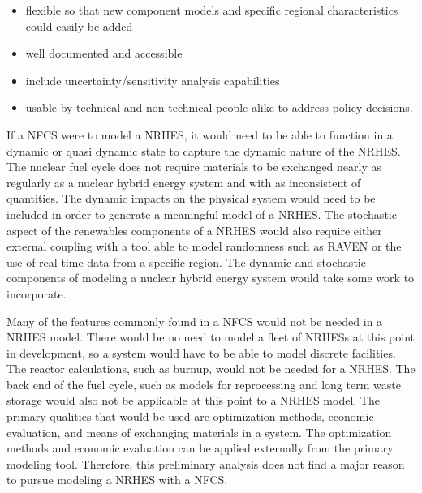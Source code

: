 \documentclass{article}                                                                           %
\begin{document}
\begin{linenumbers}
\begin{itemize}
\item flexible so that new component models and specific regional characteristics could easily be added
\item well documented and accessible
\item include uncertainty/sensitivity analysis capabilities
\item usable by technical and non technical people alike to address policy decisions.

\end{itemize}

If a NFCS were to model a NRHES, it would need to be able to function in a dynamic or quasi dynamic state to capture the dynamic nature of the NRHES.  The nuclear fuel cycle does not require materials to be exchanged nearly as regularly as a nuclear hybrid energy system and with as inconsistent of quantities. The dynamic impacts on the physical system would need to be included in order to generate a meaningful model of a NRHES. The stochastic aspect of the renewables components of a NRHES would also require either external coupling with a tool able to model randomness such as RAVEN or the use of real time data from a specific region. The dynamic and stochastic components of modeling a nuclear hybrid energy system would take some work to incorporate.

Many of the features commonly found in a NFCS would not be needed in a NRHES model.  There would be no need to model a fleet of NRHESs at this point in development, so a system would have to be able to model discrete facilities.  The reactor calculations, such as burnup, would not be needed for a NRHES.  The back end of the fuel cycle, such as models for reprocessing and long term waste storage would also not be applicable at this point to a NRHES model.  The primary qualities that would be used are optimization methods, economic evaluation, and means of exchanging materials in a system. The optimization methods and economic evaluation can be applied externally from the primary modeling tool.  Therefore, this preliminary analysis does not find a major reason to pursue modeling a NRHES with a NFCS.


\end{linenumbers}
\end{document}
